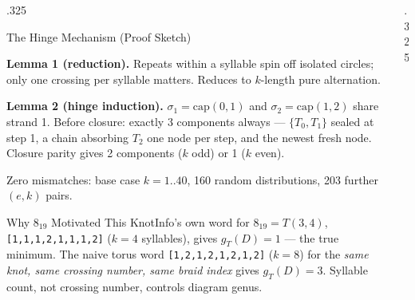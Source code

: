 \documentclass[final]{beamer}
\begin{document}
\begin{frame}[t]
\begin{columns}[t, totalwidth=\textwidth]
\begin{column}{.325\linewidth}
\begin{block}{The Hinge Mechanism (Proof Sketch)}
\vspace{14pt}
\begin{center}
\end{center}

\textbf{Lemma 1 (reduction).} Repeats within a syllable spin off isolated
circles; only one crossing per syllable matters. Reduces to $k$-length
pure alternation.

\vspace{6pt}
\textbf{Lemma 2 (hinge induction).} $\sigma_1{=}\mathrm{cap}(0,1)$ and
$\sigma_2{=}\mathrm{cap}(1,2)$ share strand 1. Before closure: exactly 3
components always --- $\{T_0,T_1\}$ sealed at step 1, a chain absorbing
$T_2$ one node per step, and the newest fresh node. Closure parity gives
2 components ($k$ odd) or 1 ($k$ even).

\vspace{6pt}
Zero mismatches: base case $k{=}1..40$, 160 random distributions, 203
further $(e,k)$ pairs.
\end{block}

\begin{block}{Why 8$_{19}$ Motivated This}
KnotInfo's own word for $8_{19}=T(3,4)$, \texttt{[1,1,1,2,1,1,1,2]}
($k{=}4$ syllables), gives $g_T(D)=1$ --- the true minimum. The naive
torus word \texttt{[1,2,1,2,1,2,1,2]} ($k{=}8$) for the \emph{same knot,
same crossing number, same braid index} gives $g_T(D)=3$. Syllable count,
not crossing number, controls diagram genus.
\end{block}

\end{column}

\begin{column}{.325\linewidth}


\end{column}
\end{columns}
\end{frame}
\end{document}
